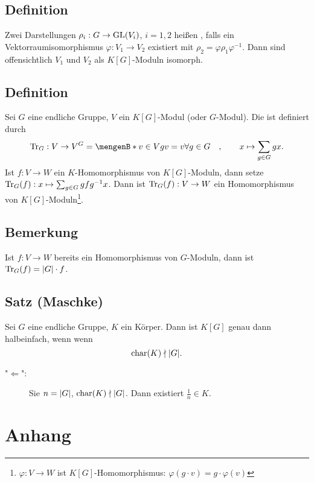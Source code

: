 \subsection[Definition: Äquivalenz von Darstellungen]{Definition} %
\label{sub:43}
Zwei Darstellungen $\rho_i : G \to \GL(V_i)$, $i=1,2$ heißen , falls ein Vektorraumisomorphismus $\varphi : V_1 \to V_2$ existiert mit 
$\rho_2 = \varphi \rho_1 \varphi ^{-1}$. Dann sind offensichtlich $V_1$ und $V_2$ als $K[G]$-Moduln isomorph. 

\subsection[Definition: Spurabbildung]{Definition} %
\label{sub:44}
Sei $G$ eine endliche Gruppe, $V$ ein $K[G]$-Modul (oder $G$-Modul). Die  ist definiert durch 
\[
	\Tr_G : V \to V^G = \set[v \in V]{g v = v \forall g \in G}  \quad , \qquad  x \mapsto \sum_{g \in G} g x.
\]
Ist $f : V \to W$ ein $K$-Homomorphismus von $K[G]$-Moduln, dann setze $\Tr_G(f) : x \mapsto \sum_{g \in G} g f g ^{-1} x$. Dann ist $\Tr_G(f): V \to W$ ein Homomorphismus
von $K[G]$-Moduln\footnote{$\varphi : V \to W$ ist $K[G]$-Homomorphismus: $\varphi(g \cdot v) = g \cdot \varphi(v)$}.

\subsection{Bemerkung} %
\label{sub:45}
Ist $f : V \to W$ bereits ein Homomorphismus von $G$-Moduln, dann ist $\Tr_G(f)= \abs*{G} \cdot f$.

\subsection{Satz (Maschke)} %
\label{sub:46}
Sei $G$ eine endliche Gruppe, $K$ ein Körper. Dann ist $K[G]$ genau dann halbeinfach, wenn wenn 
\[
	\Char(K) \nmid \abs*{G}.
\]
\begin{description}
	\item["$\Leftarrow$":] Sie $n= \abs*{G}$, $\Char(K) \nmid \abs*{G}$. Dann existiert $\frac{1}{n} \in K$. 
\end{description}


\cleardoubleoddemptypage
\appendix
\section{Anhang} %
\label{sec:anhang}
